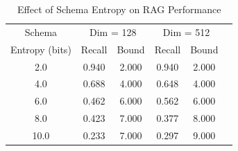 \begin{table}[t]
\centering
\caption{Effect of Schema Entropy on RAG Performance}
\label{tab:schema_entropy}
\begin{tabular}{cccccc}
\toprule
Schema & \multicolumn{2}{c}{Dim = 128} & \multicolumn{2}{c}{Dim = 512} \\
Entropy (bits) & Recall & Bound & Recall & Bound \\
\midrule
2.0 & 0.940 & 2.000 & 0.940 & 2.000 \\
4.0 & 0.688 & 4.000 & 0.648 & 4.000 \\
6.0 & 0.462 & 6.000 & 0.562 & 6.000 \\
8.0 & 0.423 & 7.000 & 0.377 & 8.000 \\
10.0 & 0.233 & 7.000 & 0.297 & 9.000 \\
\bottomrule
\end{tabular}
\end{table}
